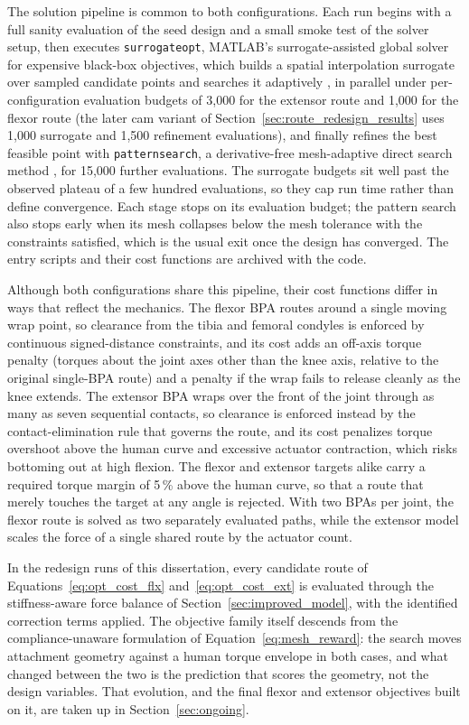 The solution pipeline is common to both configurations. Each run begins with a full sanity evaluation of the seed design and a small smoke test of the solver setup, then executes \texttt{surrogateopt}, MATLAB's surrogate-assisted global solver for expensive black-box objectives, which builds a spatial interpolation surrogate over sampled candidate points and searches it adaptively \citep{mathworks_optimization_2025}, in parallel under per-configuration evaluation budgets of 3,000 for the extensor route and 1,000 for the flexor route (the later cam variant of Section~\ref{sec:route_redesign_results} uses 1,000 surrogate and 1,500 refinement evaluations), and finally refines the best feasible point with \texttt{patternsearch}, a derivative-free mesh-adaptive direct search method \citep{audet_mads_2006, mathworks_optimization_2025}, for 15,000 further evaluations. The surrogate budgets sit well past the observed plateau of a few hundred evaluations, so they cap run time rather than define convergence. Each stage stops on its evaluation budget; the pattern search also stops early when its mesh collapses below the mesh tolerance with the constraints satisfied, which is the usual exit once the design has converged. The entry scripts and their cost functions are archived with the code.

Although both configurations share this pipeline, their cost functions differ in ways that reflect the mechanics. The flexor BPA routes around a single moving wrap point, so clearance from the tibia and femoral condyles is enforced by continuous signed-distance constraints, and its cost adds an off-axis torque penalty (torques about the joint axes other than the knee axis, relative to the original single-BPA route) and a penalty if the wrap fails to release cleanly as the knee extends. The extensor BPA wraps over the front of the joint through as many as seven sequential contacts, so clearance is enforced instead by the contact-elimination rule that governs the route, and its cost penalizes torque overshoot above the human curve and excessive actuator contraction, which risks bottoming out at high flexion. The flexor and extensor targets alike carry a required torque margin of 5\,\% above the human curve, so that a route that merely touches the target at any angle is rejected. With two BPAs per joint, the flexor route is solved as two separately evaluated paths, while the extensor model scales the force of a single shared route by the actuator count.

In the redesign runs of this dissertation, every candidate route of Equations~\eqref{eq:opt_cost_flx} and~\eqref{eq:opt_cost_ext} is evaluated through the stiffness-aware force balance of Section~\ref{sec:improved_model}, with the identified correction terms applied. The objective family itself descends from the compliance-unaware formulation of Equation~\eqref{eq:mesh_reward}: the search moves attachment geometry against a human torque envelope in both cases, and what changed between the two is the prediction that scores the geometry, not the design variables. That evolution, and the final flexor and extensor objectives built on it, are taken up in Section~\ref{sec:ongoing}.

